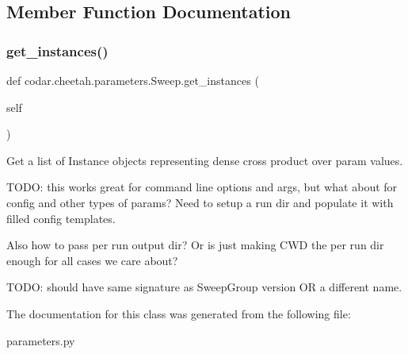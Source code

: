 \subsection{Member Function Documentation}
\mbox{\label{classcodar_1_1cheetah_1_1parameters_1_1_sweep_a25c111a2541f852d385d84baf51e9687}} 
\subsubsection{\texorpdfstring{get\+\_\+instances()}{get\_instances()}}
{\footnotesize\ttfamily def codar.\+cheetah.\+parameters.\+Sweep.\+get\+\_\+instances (\begin{DoxyParamCaption}\item[{}]{self }\end{DoxyParamCaption})}

\begin{DoxyVerb}Get a list of Instance objects representing dense cross product over
param values.

TODO: this works great for command line options and args, but
what about for config and other types of params? Need to setup
a run dir and populate it with filled config templates.

Also how to pass per run output dir? Or is just making CWD the
per run dir enough for all cases we care about?

TODO: should have same signature as SweepGroup version OR a
different name.
\end{DoxyVerb}
 

The documentation for this class was generated from the following file\+:\begin{DoxyCompactItemize}
\item 
parameters.\+py\end{DoxyCompactItemize}
